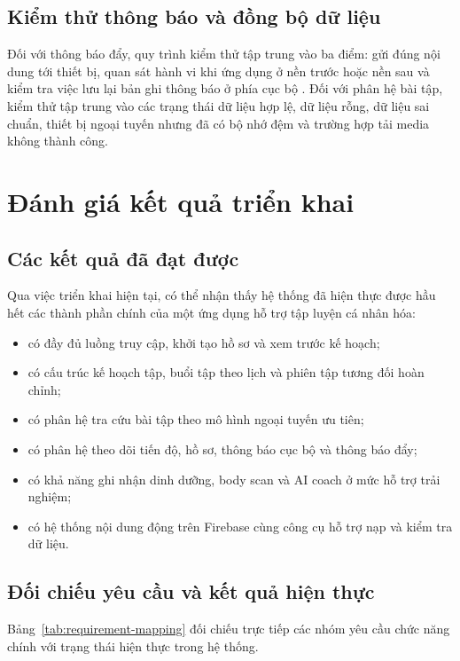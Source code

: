 \subsection{Kiểm thử thông báo và đồng bộ dữ liệu}

Đối với thông báo đẩy, quy trình kiểm thử tập trung vào ba điểm: gửi đúng nội dung tới thiết bị, quan sát hành vi khi ứng dụng ở nền trước hoặc nền sau và kiểm tra việc lưu lại bản ghi thông báo ở phía cục bộ \cite{firebase_fcm}. Đối với phân hệ bài tập, kiểm thử tập trung vào các trạng thái dữ liệu hợp lệ, dữ liệu rỗng, dữ liệu sai chuẩn, thiết bị ngoại tuyến nhưng đã có bộ nhớ đệm và trường hợp tải media không thành công.

\section{Đánh giá kết quả triển khai}

\subsection{Các kết quả đã đạt được}

Qua việc triển khai hiện tại, có thể nhận thấy hệ thống đã hiện thực được hầu hết các thành phần chính của một ứng dụng hỗ trợ tập luyện cá nhân hóa:

\begin{itemize}
    \item có đầy đủ luồng truy cập, khởi tạo hồ sơ và xem trước kế hoạch;
    \item có cấu trúc kế hoạch tập, buổi tập theo lịch và phiên tập tương đối hoàn chỉnh;
    \item có phân hệ tra cứu bài tập theo mô hình ngoại tuyến ưu tiên;
    \item có phân hệ theo dõi tiến độ, hồ sơ, thông báo cục bộ và thông báo đẩy;
    \item có khả năng ghi nhận dinh dưỡng, body scan và AI coach ở mức hỗ trợ trải nghiệm;
    \item có hệ thống nội dung động trên Firebase cùng công cụ hỗ trợ nạp và kiểm tra dữ liệu.
\end{itemize}

\subsection{Đối chiếu yêu cầu và kết quả hiện thực}

Bảng~\ref{tab:requirement-mapping} đối chiếu trực tiếp các nhóm yêu cầu chức năng chính với trạng thái hiện thực trong hệ thống.


